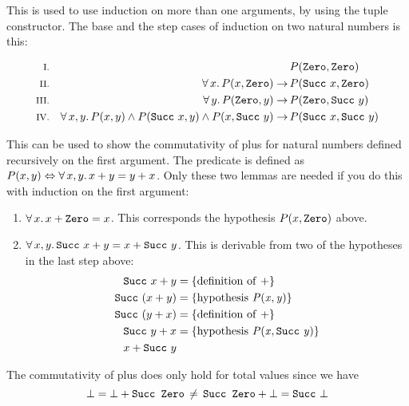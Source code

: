 \pagebreak

This is used to use induction on more than one arguments, by using the
tuple constructor. The base and the step cases of induction on two
natural numbers is this:

\begin{align*}
\rom{1} &&                                                                                        & P(\hs{Zero}     ,\hs{Zero}     ) \\
\rom{2} && \fa{x} P(x,\hs{Zero})                                                   \rightarrow \, & P(\hs{Succ} \w x,\hs{Zero}     ) \\
\rom{3} && \fa{y} P(\hs{Zero},y)                                                   \rightarrow \, & P(\hs{Zero}     ,\hs{Succ} \w y) \\
\rom{4} && \faa{x}{y} P(x,y) \wedge P(\hs{Succ} \w x,y) \wedge P(x,\hs{Succ} \w y) \rightarrow \, & P(\hs{Succ} \w x,\hs{Succ} \w y) \\
\end{align*}

This can be used to show the commutativity of plus for natural numbers
defined recursively on the first argument. The predicate is defined as
$P(x,y) \Leftrightarrow \forall \, x , y . \, x + y = y + x$. Only these two
lemmas are needed if you do this with induction on the first argument:
\begin{enumerate}
  \item $\fa{x} x + \hs{Zero} = x$. This corresponds the hypothesis
    $P(x,\hs{Zero})$ above.
  \item $\faa{x}{y} \hs{Succ} \w x + y = x + \hs{Succ} \w y$. This is
    derivable from two of the hypotheses in the last step above:
    \begin{align*}
    \hs{Succ} \w x + y   & = \{\mathrm{definition \w of \w \mathit{+}}\} \\
    \hs{Succ} \w (x + y) & = \{\mathrm{hypothesis \w \mathit{P(x,y)}}\} \\
    \hs{Succ} \w (y + x) & = \{\mathrm{definition \w of \w \mathit{+}}\} \\
    \hs{Succ} \w y + x   & = \{\mathrm{hypothesis \w \mathit{P(x,\hs{Succ} \w y)}}\} \\
    x + \hs{Succ} \w y
    \end{align*}
\end{enumerate}

The commutativity of plus does only hold for total values since we have
$$\bot \eq \bot + \hs{Succ Zero} \, \neq \, \hs{Succ Zero} + \bot \eq \hs{Succ} \w \bot$$

